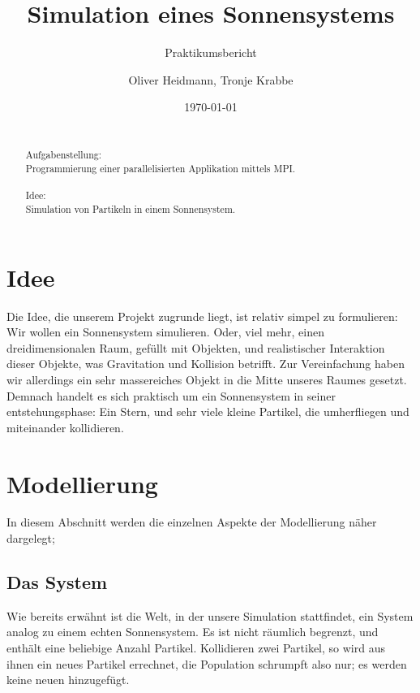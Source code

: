 \title{Simulation eines Sonnensystems}
\subtitle{Praktikumsbericht}

\author{Oliver Heidmann, Tronje Krabbe}

  
\date{\today}

\maketitle

\newpage
\begin{abstract}
\quad \\
Aufgabenstellung: \\
Programmierung einer parallelisierten Applikation mittels MPI. \\ \\
Idee: \\
Simulation von Partikeln in einem Sonnensystem.
\end{abstract}

\tableofcontents
\newpage
\section{Idee}
Die Idee, die unserem Projekt zugrunde liegt, ist relativ simpel zu formulieren:
Wir wollen ein Sonnensystem simulieren. Oder, viel mehr, einen dreidimensionalen Raum,
gefüllt mit Objekten, und realistischer Interaktion dieser Objekte,
was Gravitation und Kollision betrifft. Zur Vereinfachung haben wir allerdings
ein sehr massereiches Objekt in die Mitte unseres Raumes gesetzt. Demnach
handelt es sich praktisch um ein Sonnensystem in seiner entstehungsphase:
Ein Stern, und sehr viele kleine Partikel, die umherfliegen und miteinander
kollidieren.

\section{Modellierung}
In diesem Abschnitt werden die einzelnen Aspekte der Modellierung näher dargelegt;

\subsection{Das System}
Wie bereits erwähnt ist die Welt, in der unsere Simulation stattfindet,
ein System analog zu einem echten Sonnensystem. Es ist nicht räumlich begrenzt,
und enthält eine beliebige Anzahl Partikel. Kollidieren zwei Partikel, so wird aus ihnen
ein neues Partikel errechnet, die Population schrumpft also nur; es werden keine neuen
hinzugefügt.

